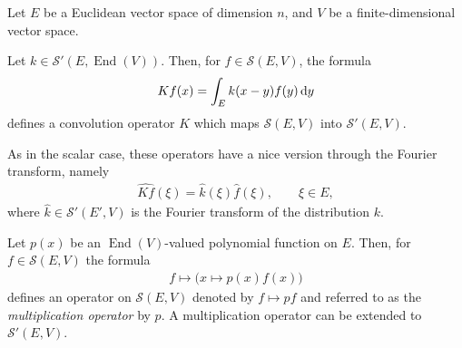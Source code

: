 \documentclass[pdftex]{sigma}
\DeclareMathOperator{\End}{End}
\numberwithin{equation}{section}
\begin{document}
Let $E$ be a Euclidean vector space of dimension $n$, and $V$ be a finite-dimensional vector space.

Let $k\in \mathcal S'(E,\End(V))$. Then, for $f\in \mathcal S(E,V)$, the formula
\begin{gather*}
Kf(x) = \int_E k(x-y) f(y)\,{\rm d}y
\end{gather*}
defines a convolution operator $K$ which maps $\mathcal S(E,V)$ into $\mathcal S'(E,V)$.

As in the scalar case, these operators have a nice version through the Fourier transform, namely
\begin{gather*}
\widehat {Kf} (\xi) = \widehat k (\xi) \widehat f(\xi), \qquad \xi\in E ,
\end{gather*}
where $\widehat k \in \mathcal S'(E',V)$ is the Fourier transform of the distribution $k$.

Let $p(x)$ be an $\End(V)$-valued polynomial function on $E$. Then, for $f\in \mathcal S(E,V)$ the formula
\begin{gather*}
f \mapsto \big(x\mapsto p(x) f(x)\big)
\end{gather*}
defines an operator on $\mathcal S(E,V)$
 denoted by $f\mapsto pf$ and referred to as the \emph{multiplication operator} by
$p$. A multiplication operator can be extended to $\mathcal S'(E,V)$.
\end{document}
